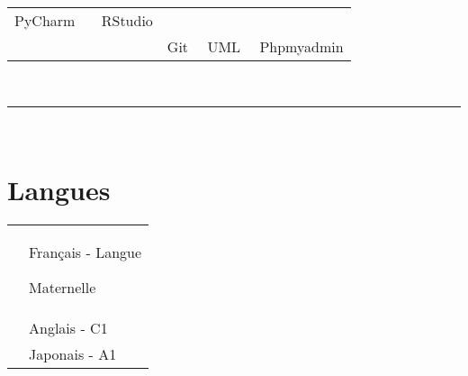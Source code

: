 \documentclass[oneside]{article}
\begin{document}
{\begin{minipage}[t][\textheight-2\fboxsep-2\fboxrule][t]{\dimexpr0.30\textwidth-2\fboxrule-2\fboxsep\relax}
\begin{tabularx}{\textwidth}{cY}
            PyCharm \ \ \ RStudio \\
            \faToolbox{}     & Git \ \ UML \ \ Phpmyadmin
        \end{tabularx}
        \vspace{8pt} \\
        \rule{\linewidth}{0.4pt}
        \vspace{8pt} \\
        
        \section*{\large Langues}
        \vspace{.2cm}
        \begin{tabularx}{\textwidth}{cY}
            \vspace{.3cm}
            \faLanguage{} & Français - Langue
            
            Maternelle \\
            \vspace{.3cm}
            \faLanguage{} & Anglais - C1 \\
            \vspace{.3cm}
            \faLanguage{} & Japonais - A1 \\
        \end{tabularx}
        \vspace{8pt} \\
        
        
        \vfill
        
        
    \end{minipage}
}
\end{document}
